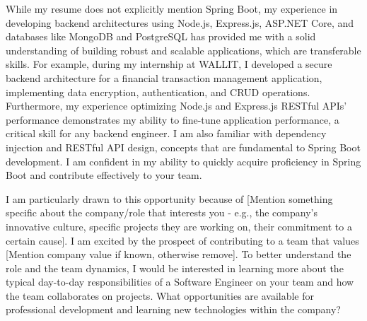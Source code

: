 \documentclass[letterpaper,11pt]{article}
\begin{document}
\vspace{10pt}
While my resume does not explicitly mention Spring Boot, my experience in developing backend architectures using Node.js, Express.js, ASP.NET Core, and databases like MongoDB and PostgreSQL has provided me with a solid understanding of building robust and scalable applications, which are transferable skills. For example, during my internship at WALLIT, I developed a secure backend architecture for a financial transaction management application, implementing data encryption, authentication, and CRUD operations. Furthermore, my experience optimizing Node.js and Express.js RESTful APIs' performance demonstrates my ability to fine-tune application performance, a critical skill for any backend engineer. I am also familiar with dependency injection and RESTful API design, concepts that are fundamental to Spring Boot development. I am confident in my ability to quickly acquire proficiency in Spring Boot and contribute effectively to your team.
\vspace{10pt}

\vspace{10pt}
I am particularly drawn to this opportunity because of [Mention something specific about the company/role that interests you - e.g., the company's innovative culture, specific projects they are working on, their commitment to a certain cause]. I am excited by the prospect of contributing to a team that values [Mention company value if known, otherwise remove]. To better understand the role and the team dynamics, I would be interested in learning more about the typical day-to-day responsibilities of a Software Engineer on your team and how the team collaborates on projects. What opportunities are available for professional development and learning new technologies within the company?
\vspace{10pt}
\end{document}
